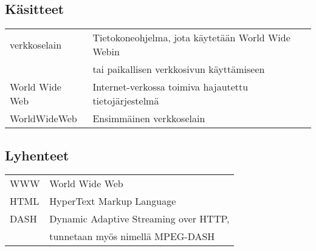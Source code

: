 \documentclass[finnish, 12pt, a4paper, elec, utf8, a-1b, online]{aaltothesis}
\date{XX.XX.2022}
\begin{document}
\makecoverpage{}

\makecopyrightpage{}

\begin{abstractpage}[finnish]
  \abstracttext{}
\end{abstractpage}


\newpage

\thesistableofcontents


\subsection*{Käsitteet}
\begin{tabular}{ll}
  verkkoselain    & Tietokoneohjelma, jota käytetään World Wide Webin \\
                  & tai paikallisen verkkosivun käyttämiseen \\
  World Wide Web  & Internet-verkossa toimiva hajautettu tietojärjestelmä \\
  WorldWideWeb    & Ensimmäinen verkkoselain
\end{tabular}

\subsection*{Lyhenteet}
\begin{tabular}{ll}
  WWW       & World Wide Web \\
  HTML      & HyperText Markup Language \\
  DASH      & Dynamic Adaptive Streaming over HTTP, \\
            & tunnetaan myös nimellä MPEG-DASH \\
\end{tabular}
\end{document}
